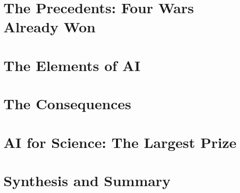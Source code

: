 \documentclass[11pt,a4paper,oneside]{book}
\begin{document}
\tableofcontents



\mainmatter




\part{The Precedents: Four Wars Already Won}
\label{part:precedents}








\part{The Elements of AI}
\label{part:ai}











\part{The Consequences}
\label{part:consequences}








\part{AI for Science: The Largest Prize}
\label{part:science}






\part{Synthesis and Summary}
\label{part:summary}






\backmatter


\end{document}
